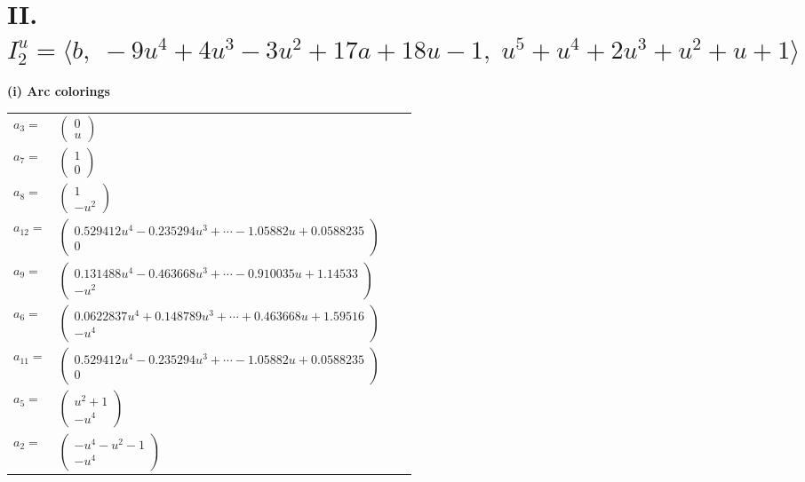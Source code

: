 \documentclass[1p]{elsarticle_modified}
\theoremstyle{definition}
\begin{document}
\centering \section*{II. $I^u_{2}= \langle b,\;-9 u^4+4 u^3-3 u^2+17 a+18 u-1,\;u^5+u^4+2 u^3+u^2+u+1 \rangle$}
\flushleft \textbf{(i) Arc colorings}\\
\begin{tabular}{m{7pt} m{180pt} m{7pt} m{180pt} }
\flushright $a_{3}=$&$\begin{pmatrix}0\\u\end{pmatrix}$ \\
\flushright $a_{7}=$&$\begin{pmatrix}1\\0\end{pmatrix}$ \\
\flushright $a_{8}=$&$\begin{pmatrix}1\\- u^2\end{pmatrix}$ \\
\flushright $a_{12}=$&$\begin{pmatrix}0.529412 u^{4}-0.235294 u^{3}+\cdots-1.05882 u+0.0588235\\0\end{pmatrix}$ \\
\flushright $a_{9}=$&$\begin{pmatrix}0.131488 u^{4}-0.463668 u^{3}+\cdots-0.910035 u+1.14533\\- u^2\end{pmatrix}$ \\
\flushright $a_{6}=$&$\begin{pmatrix}0.0622837 u^{4}+0.148789 u^{3}+\cdots+0.463668 u+1.59516\\- u^4\end{pmatrix}$ \\
\flushright $a_{11}=$&$\begin{pmatrix}0.529412 u^{4}-0.235294 u^{3}+\cdots-1.05882 u+0.0588235\\0\end{pmatrix}$ \\
\flushright $a_{5}=$&$\begin{pmatrix}u^2+1\\- u^4\end{pmatrix}$ \\
\flushright $a_{2}=$&$\begin{pmatrix}- u^4- u^2-1\\- u^4\end{pmatrix}$ \\

\end{tabular}
\end{document}
